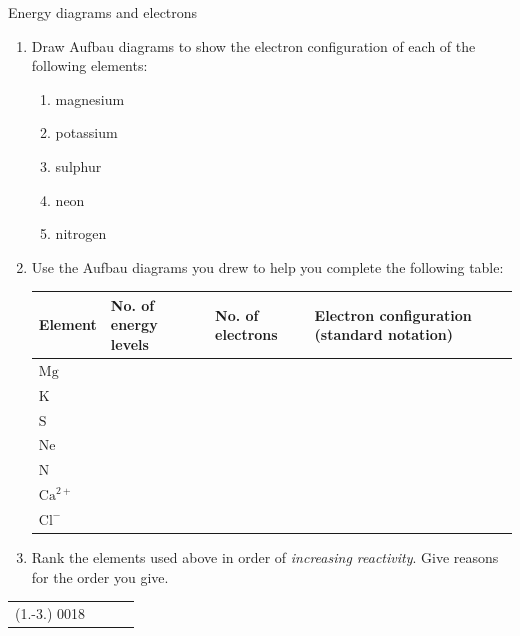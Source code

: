 \begin{exercises}{Energy diagrams and electrons}
            \nopagebreak \noindent \vspace{-2cm}
        \label{m38741*id260063}\begin{enumerate}[noitemsep, label=\textbf{\arabic*}. ] 
            \label{m38741*uid106}\item Draw Aufbau diagrams to show the electron configuration of each of the following elements:
\begin{multicols}{2}
\label{m38741*id260079}\begin{enumerate}[noitemsep, label=\textbf{\alph*}. ] 
            \label{m38741*uid107}\item magnesium
\label{m38741*uid108}\item potassium
\label{m38741*uid109}\item sulphur
\label{m38741*uid110}\item neon
\label{m38741*uid111}\item nitrogen
\end{enumerate}
\end{multicols}
        \label{m38741*uid112}\item Use the Aufbau diagrams you drew to help you complete the following table:
       \begin{center}
\begin{tabular}{|p{1.6cm}|p{2.6cm}|p{2.6cm}|p{2.6cm}|}\hline
\textbf{Element} & \textbf{No.\@{} of energy levels} & \textbf{No.\@{} of electrons}  & \textbf{Electron configuration (standard notation)}\\\hline
$\text{Mg}$ & &  & \\\hline
$\text{K}$ & &  & \\\hline
$\text{S}$ & & & \\\hline
$\text{Ne}$ &  & & \\\hline
$\text{N}$ & & & \\\hline
$\text{Ca}^{2+}$ & & & \\\hline
$\text{Cl}^{-}$ & & & \\\hline
\end{tabular}
\end{center}    
  \label{m38741*uid113}\item Rank the elements used above in order of \textsl{increasing reactivity}. Give reasons for the order you give.
 \end{enumerate}
\practiceinfo
 \par \begin{tabular}[h]{cccc}
 (1.-3.) 0018 & & & \end{tabular}
\end{exercises}            
